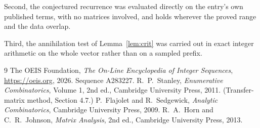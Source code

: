 \documentclass[11pt,a4paper]{article}
\theoremstyle{plain}
\theoremstyle{definition}
\begin{document}
Second, the conjectured recurrence was evaluated directly on the entry's own published terms,
with no matrices involved, and holds wherever the proved range and the data overlap.

Third, the annihilation test of Lemma~\ref{lem:crit} was carried out in exact integer
arithmetic on the whole vector rather than on a sampled prefix.

\begin{thebibliography}{9}
 The OEIS Foundation, \emph{The On-Line Encyclopedia of Integer
Sequences}, \url{https://oeis.org}, 2026. Sequence A283227.
 R.~P.~Stanley, \emph{Enumerative Combinatorics}, Volume 1, 2nd ed.,
Cambridge University Press, 2011. (Transfer-matrix method, Section 4.7.)
 P.~Flajolet and R.~Sedgewick, \emph{Analytic Combinatorics}, Cambridge
University Press, 2009.
 R.~A.~Horn and C.~R.~Johnson, \emph{Matrix Analysis}, 2nd ed., Cambridge
University Press, 2013.
\end{thebibliography}
\end{document}
